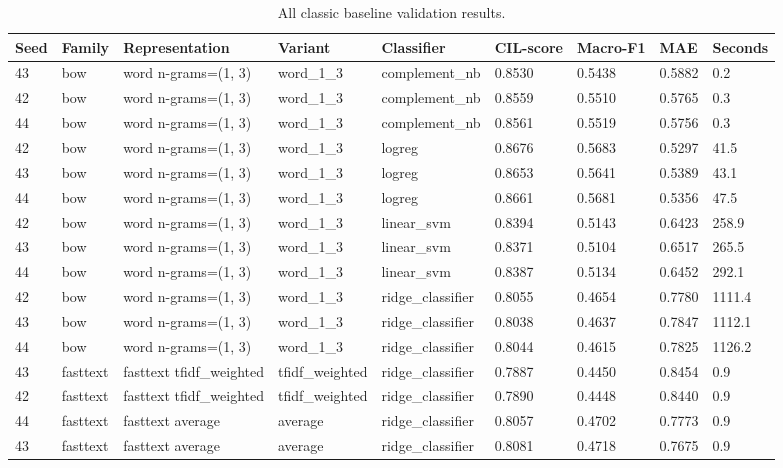 \begin{table}[htbp]
\centering
\caption{All classic baseline validation results.}
\label{tab:classic-full-results}
\begin{tabular}{lllllllll}
\toprule
Seed & Family & Representation & Variant & Classifier & CIL-score & Macro-F1 & MAE & Seconds \\
\midrule
43 & bow & word n-grams=(1, 3) & word\_1\_3 & complement\_nb & 0.8530 & 0.5438 & 0.5882 & 0.2 \\
42 & bow & word n-grams=(1, 3) & word\_1\_3 & complement\_nb & 0.8559 & 0.5510 & 0.5765 & 0.3 \\
44 & bow & word n-grams=(1, 3) & word\_1\_3 & complement\_nb & 0.8561 & 0.5519 & 0.5756 & 0.3 \\
42 & bow & word n-grams=(1, 3) & word\_1\_3 & logreg & 0.8676 & 0.5683 & 0.5297 & 41.5 \\
43 & bow & word n-grams=(1, 3) & word\_1\_3 & logreg & 0.8653 & 0.5641 & 0.5389 & 43.1 \\
44 & bow & word n-grams=(1, 3) & word\_1\_3 & logreg & 0.8661 & 0.5681 & 0.5356 & 47.5 \\
42 & bow & word n-grams=(1, 3) & word\_1\_3 & linear\_svm & 0.8394 & 0.5143 & 0.6423 & 258.9 \\
43 & bow & word n-grams=(1, 3) & word\_1\_3 & linear\_svm & 0.8371 & 0.5104 & 0.6517 & 265.5 \\
44 & bow & word n-grams=(1, 3) & word\_1\_3 & linear\_svm & 0.8387 & 0.5134 & 0.6452 & 292.1 \\
42 & bow & word n-grams=(1, 3) & word\_1\_3 & ridge\_classifier & 0.8055 & 0.4654 & 0.7780 & 1111.4 \\
43 & bow & word n-grams=(1, 3) & word\_1\_3 & ridge\_classifier & 0.8038 & 0.4637 & 0.7847 & 1112.1 \\
44 & bow & word n-grams=(1, 3) & word\_1\_3 & ridge\_classifier & 0.8044 & 0.4615 & 0.7825 & 1126.2 \\
43 & fasttext & fasttext tfidf\_weighted & tfidf\_weighted & ridge\_classifier & 0.7887 & 0.4450 & 0.8454 & 0.9 \\
42 & fasttext & fasttext tfidf\_weighted & tfidf\_weighted & ridge\_classifier & 0.7890 & 0.4448 & 0.8440 & 0.9 \\
44 & fasttext & fasttext average & average & ridge\_classifier & 0.8057 & 0.4702 & 0.7773 & 0.9 \\
43 & fasttext & fasttext average & average & ridge\_classifier & 0.8081 & 0.4718 & 0.7675 & 0.9 \\

\end{tabular}
\end{table}
